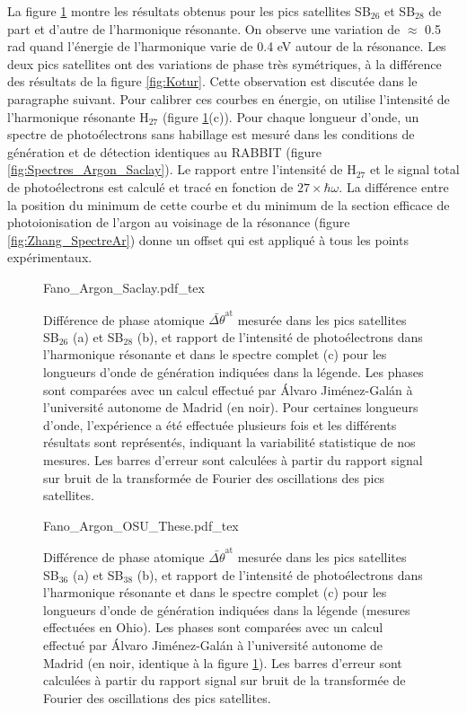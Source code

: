 La figure \ref{fig:Phases_Argon_Saclay} montre les résultats obtenus pour les pics satellites SB$_{26}$ et SB$_{28}$ de part et d'autre de l'harmonique résonante. On observe une variation de $\approx$ 0.5 rad quand l'énergie de l'harmonique varie de 0.4 eV autour de la résonance. Les deux pics satellites ont des variations de phase très symétriques, à la différence des résultats de la figure \ref{fig:Kotur}. Cette observation est discutée dans le paragraphe suivant. Pour calibrer ces courbes en énergie, on utilise l'intensité de l'harmonique résonante H$_{27}$ (figure \ref{fig:Phases_Argon_Saclay}(c)). Pour chaque longueur d'onde, un spectre de photoélectrons sans habillage est mesuré dans les conditions de génération et de détection identiques au RABBIT (figure \ref{fig:Spectres_Argon_Saclay}). Le rapport entre l'intensité de H$_{27}$ et le signal total de photoélectrons est calculé et tracé en fonction de $27 \times \hbar \omega$. La différence entre la position du minimum de cette courbe et du minimum de la section efficace de photoionisation de l'argon au voisinage de la résonance (figure \ref{fig:Zhang_SpectreAr}) donne un offset qui est appliqué à tous les points expérimentaux.

\begin{figure}[ht]
\centering
\def\svgwidth{1\textwidth}
{Fano_Argon_Saclay.pdf_tex}
\caption{Différence de phase atomique $\bar{\Delta \theta}^{\text{at}}$ mesurée dans les pics satellites SB$_{26}$ (a) et SB$_{28}$ (b), et rapport de l'intensité de photoélectrons dans l'harmonique résonante et dans le spectre complet (c) pour les longueurs d'onde de génération indiquées dans la légende. Les phases sont comparées avec un calcul effectué par \'{A}lvaro Jiménez-Gal\'{a}n à l'université autonome de Madrid (en noir). Pour certaines longueurs d'onde, l'expérience a été effectuée plusieurs fois et les différents résultats sont représentés, indiquant la variabilité statistique de nos mesures. Les barres d'erreur sont calculées à partir du rapport signal sur bruit de la transformée de Fourier des oscillations des pics satellites.}
\label{fig:Phases_Argon_Saclay}
\end{figure}

\begin{figure}[ht]
\centering
\def\svgwidth{1\textwidth}
{Fano_Argon_OSU_These.pdf_tex}
\caption{Différence de phase atomique $\bar{\Delta \theta}^{\text{at}}$ mesurée dans les pics satellites SB$_{36}$ (a) et SB$_{38}$ (b), et rapport de l'intensité de photoélectrons dans l'harmonique résonante et dans le spectre complet (c) pour les longueurs d'onde de génération indiquées dans la légende (mesures effectuées en Ohio). Les phases sont comparées avec un calcul effectué par \'{A}lvaro Jiménez-Gal\'{a}n à l'université autonome de Madrid (en noir, identique à la figure \ref{fig:Phases_Argon_Saclay}). Les barres d'erreur sont calculées à partir du rapport signal sur bruit de la transformée de Fourier des oscillations des pics satellites.}
\label{fig:Phases_Argon_OSU}
\end{figure}

